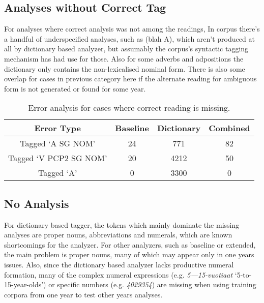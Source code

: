 \documentclass[a4paper]{article}
\begin{document}
\subsection{Analyses without Correct Tag}

For analyses where correct analysis was not among the readings, 
In corpus there’s a handful of underspecified analyses, such as (blah A),
which aren’t produced at all by dictionary based analyzer, but assumably the
corpus’s syntactic tagging mechanism has had use for those. Also for some
adverbs and adpositions the dictionary only contains the non-lexicalised
nominal form. There is also some overlap for cases in previous category here
if the alternate reading for ambiguous form is not generated or found for some
year.

\begin{table}[h!]
  \centering
  \caption{Error analysis for cases where correct reading is missing.
  }\label{tab:incorrect1}
  \begin{scriptsize}
    \begin{tabular}{c|c|c|c}
      \hline
      Error Type & Baseline & Dictionary & Combined \\
	  \hline
	  Tagged `A SG NOM' & 24 & 771 & 82 \\
	  Tagged `V PCP2 SG NOM' & 20 & 4212 & 50 \\
	  Tagged `A' & 0 & 3300 & 0 \\
	  \hline 
    \end{tabular}
  \end{scriptsize}
\end{table}

\subsection{No Analysis}

For dictionary based tagger, the tokens which mainly dominate the missing
analyses are proper nouns, abbreviations and numerals, which are known
shortcomings for the analyzer. For other analyzers, such as baseline or
extended, the main problem is proper nouns, many of which may appear only in
one years issues. Also, since the dictionary based analyzer lacks productive
numeral formation, many of the complex numeral expressions (e.g.
\emph{5---15-vuotiaat} `5-to-15-year-olds')  or specific numbers (e.g. 
\emph{4029354})
are missing when using training corpora from one year to test other years
analyses.
\end{document}
